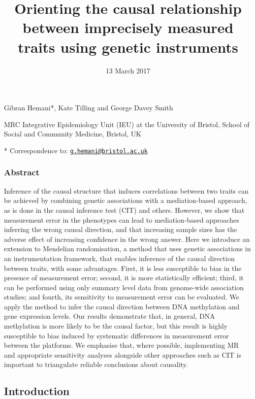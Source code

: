 \documentclass[]{article}
\title{Orienting the causal relationship between imprecisely measured traits
using genetic instruments}
\author{}
\date{13 March 2017}
\begin{document}
\maketitle

Gibran Hemani*, Kate Tilling and George Davey Smith

MRC Integrative Epidemiology Unit (IEU) at the University of Bristol,
School of Social and Community Medicine, Bristol, UK

* Correspondence to:
\href{mailto:g.hemani@bristol.ac.uk}{\nolinkurl{g.hemani@bristol.ac.uk}}

\subsubsection{Abstract}\label{abstract}

Inference of the causal structure that induces correlations between two
traits can be achieved by combining genetic associations with a
mediation-based approach, as is done in the causal inference test (CIT)
and others. However, we show that measurement error in the phenotypes
can lead to mediation-based approaches inferring the wrong causal
direction, and that increasing sample sizes has the adverse effect of
increasing confidence in the wrong answer. Here we introduce an
extension to Mendelian randomisation, a method that uses genetic
associations in an instrumentation framework, that enables inference of
the causal direction between traits, with some advantages. First, it is
less susceptible to bias in the presence of measurement error; second,
it is more statistically efficient; third, it can be performed using
only summary level data from genome-wide association studies; and
fourth, its sensitivity to measurement error can be evaluated. We apply
the method to infer the causal direction between DNA methylation and
gene expression levels. Our results demonstrate that, in general, DNA
methylation is more likely to be the causal factor, but this result is
highly susceptible to bias induced by systematic differences in
measurement error between the platforms. We emphasise that, where
possible, implementing MR and appropriate sensitivity analyses alongside
other approaches such as CIT is important to triangulate reliable
conclusions about causality.

\subsection{Introduction}\label{introduction}
\end{document}
